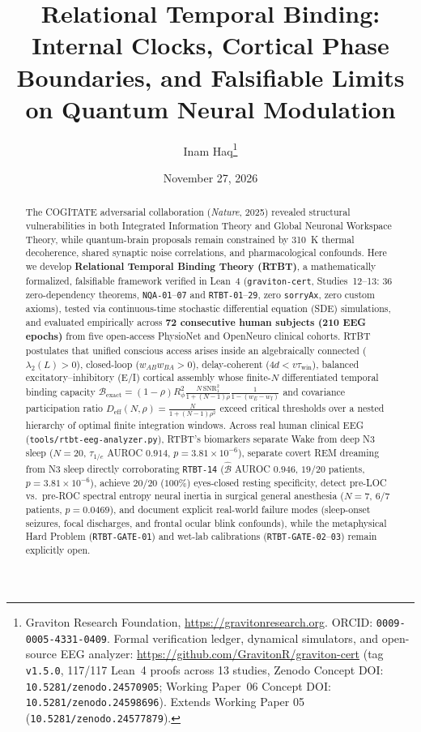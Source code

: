 \documentclass[11pt,letterpaper]{article}
\title{\textbf{Relational Temporal Binding: Internal Clocks, Cortical Phase Boundaries, and Falsifiable Limits on Quantum Neural Modulation}}
\author{Inam Haq\thanks{Graviton Research Foundation, \url{https://gravitonresearch.org}. ORCID: \texttt{0009-0005-4331-0409}. Formal verification ledger, dynamical simulators, and open-source EEG analyzer: \url{https://github.com/GravitonR/graviton-cert} (tag \texttt{v1.5.0}, 117/117 Lean~4 proofs across 13 studies, Zenodo Concept DOI: \texttt{10.5281/zenodo.24570905}; Working Paper~06 Concept DOI: \texttt{10.5281/zenodo.24598696}). Extends Working Paper 05 (\texttt{10.5281/zenodo.24577879}).}}
\date{November 27, 2026}
\newcommand{\code}[1]{\texttt{\small #1}}
\begin{document}
\maketitle

\begin{abstract}
The COGITATE adversarial collaboration (\emph{Nature}, 2025) revealed structural vulnerabilities in both Integrated Information Theory and Global Neuronal Workspace Theory, while quantum-brain proposals remain constrained by 310~K thermal decoherence, shared synaptic noise correlations, and pharmacological confounds. Here we develop \textbf{Relational Temporal Binding Theory (RTBT)}, a mathematically formalized, falsifiable framework verified in Lean~4 (\code{graviton-cert}, Studies~12--13: 36 zero-dependency theorems, \code{NQA-01}--\code{07} and \code{RTBT-01}--\code{29}, zero \code{sorryAx}, zero custom axioms), tested via continuous-time stochastic differential equation (SDE) simulations, and evaluated empirically across \textbf{72 consecutive human subjects (210 EEG epochs)} from five open-access PhysioNet and OpenNeuro clinical cohorts. RTBT postulates that unified conscious access arises inside an algebraically connected ($\lambda_2(L) > 0$), closed-loop ($w_{AB}w_{BA} > 0$), delay-coherent ($4d < v\tau_{\mathrm{win}}$), balanced excitatory--inhibitory (E/I) cortical assembly whose finite-$N$ differentiated temporal binding capacity $\mathcal{B}_{\mathrm{exact}} = (1-\rho)R_\phi^2 \frac{N\,\mathrm{SNR}_1^2}{1+(N-1)\rho}\frac{1}{1-(w_E-w_I)}$ and covariance participation ratio $D_{\mathrm{eff}}(N,\rho) = \frac{N}{1+(N-1)\rho^2}$ exceed critical thresholds over a nested hierarchy of optimal finite integration windows. Across real human clinical EEG (\code{tools/rtbt-eeg-analyzer.py}), RTBT's biomarkers separate Wake from deep N3 sleep ($N=20$, $\tau_{1/e}$ AUROC $0.914$, $p=3.81\times 10^{-6}$), separate covert REM dreaming from N3 sleep directly corroborating \code{RTBT-14} ($\widehat{\mathcal{B}}$ AUROC $0.946$, $19/20$ patients, $p=3.81\times 10^{-6}$), achieve $20/20$ ($100\%$) eyes-closed resting specificity, detect pre-LOC vs.\ pre-ROC spectral entropy neural inertia in surgical general anesthesia ($N=7$, $6/7$ patients, $p=0.0469$), and document explicit real-world failure modes (sleep-onset seizures, focal discharges, and frontal ocular blink confounds), while the metaphysical Hard Problem (\code{RTBT-GATE-01}) and wet-lab calibrations (\code{RTBT-GATE-02}--\code{03}) remain explicitly open.
\end{abstract}
\end{document}
